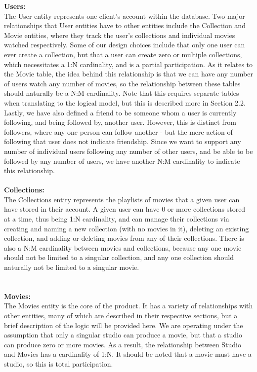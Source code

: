 \documentclass[12pt]{article}
\begin{document}
    \textbf{Users:} \\ The User entity represents one client’s account within the database. Two major relationships that User entities have to other entities include the Collection and Movie entities, where they track the user’s collections and individual movies watched respectively. Some of our design choices include that only one user can ever create a collection, but that a user can create zero or multiple collections, which necessitates a 1:N cardinality, and is a partial participation.
    As it relates to the Movie table, the idea behind this relationship is that we can have any number of users watch any number of movies, so the relationship between these tables should naturally be a N:M cardinality. Note that this requires separate tables when translating to the logical model, but this is described more in Section 2.2.
    Lastly, we have also defined a friend to be someone whom a user is currently following, and being followed by, another user. However, this is distinct from followers, where any one person can follow another - but the mere action of following that user does not indicate friendship. Since we want to support any number of individual users following any number of other users, and be able to be followed by any number of users, we have another N:M cardinality to indicate this relationship. \\ \\
    \textbf{Collections:} \\ The Collections entity represents the playlists of movies that a given user can have stored in their account. A given user can have 0 or more collections stored at a time, thus being 1:N cardinality, and can manage their collections via creating and naming a new collection (with no movies in it), deleting an existing collection, and adding or deleting movies from any of their collections. There is also a N:M cardinality between movies and collections, because any one movie should not be limited to a singular collection, and any one collection should naturally not be limited to a singular movie. \\ \\ \\
    \textbf{Movies:} \\ The Movies entity is the core of the product. It has a variety of relationships with other entities, many of which are described in their respective sections, but a brief description of the logic will be provided here.
    We are operating under the assumption that only a singular studio can produce a movie, but that a studio can produce zero or more movies. As a result, the relationship between Studio and Movies has a cardinality of 1:N. It should be noted that a movie must have a studio, so this is total participation.
\end{document}
